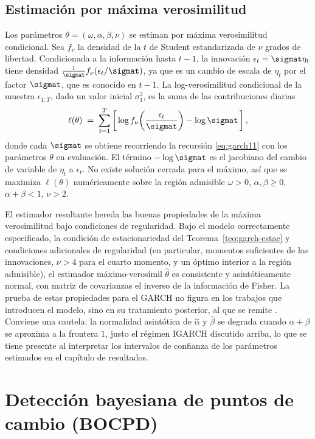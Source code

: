 \subsection{Estimación por máxima verosimilitud}
\label{sec:garch-mv}

Los parámetros $\theta = (\omega, \alpha, \beta, \nu)$ se estiman por máxima verosimilitud condicional. Sea $f_\nu$ la densidad de la $t$ de Student estandarizada de $\nu$ grados de libertad. Condicionada a la información hasta $t-1$, la innovación $\epsilon_t = \sigmat \eta_t$ tiene densidad $\tfrac{1}{\sigmat} f_\nu(\epsilon_t/\sigmat)$, ya que es un cambio de escala de $\eta_t$ por el factor $\sigmat$, que es conocido en $t-1$. La log-verosimilitud condicional de la muestra $\epsilon_{1:T}$, dado un valor inicial $\sigma_1^2$, es la suma de las contribuciones diarias
\[
\ell(\theta) \;=\; \sum_{t=1}^{T} \left[\, \log f_\nu\!\left(\frac{\epsilon_t}{\sigmat}\right) - \log \sigmat \,\right],
\]
donde cada $\sigmat$ se obtiene recorriendo la recursión \eqref{eq:garch11} con los parámetros $\theta$ en evaluación. El término $-\log\sigmat$ es el jacobiano del cambio de variable de $\eta_t$ a $\epsilon_t$. No existe solución cerrada para el máximo, así que se maximiza $\ell(\theta)$ numéricamente sobre la región admisible $\omega>0$, $\alpha,\beta\ge 0$, $\alpha+\beta<1$, $\nu>2$.

El estimador resultante hereda las buenas propiedades de la máxima verosimilitud bajo condiciones de regularidad. Bajo el modelo correctamente especificado, la condición de estacionariedad del Teorema~\ref{teo:garch-estac} y condiciones adicionales de regularidad (en particular, momentos suficientes de las innovaciones, $\nu>4$ para el cuarto momento, y un óptimo interior a la región admisible), el estimador máximo-verosímil $\hat\theta$ es consistente y asintóticamente normal, con matriz de covarianzas el inverso de la información de Fisher. La prueba de estas propiedades para el GARCH no figura en los trabajos que introducen el modelo, sino en su tratamiento posterior, al que se remite \cite{francqzakoian2019}. Conviene una cautela: la normalidad asintótica de $\hat\alpha$ y $\hat\beta$ se degrada cuando $\alpha+\beta$ se aproxima a la frontera $1$, justo el régimen IGARCH discutido arriba, lo que se tiene presente al interpretar los intervalos de confianza de los parámetros estimados en el capítulo de resultados.

\section{Detección bayesiana de puntos de cambio (BOCPD)}
\label{sec:bocpd}

